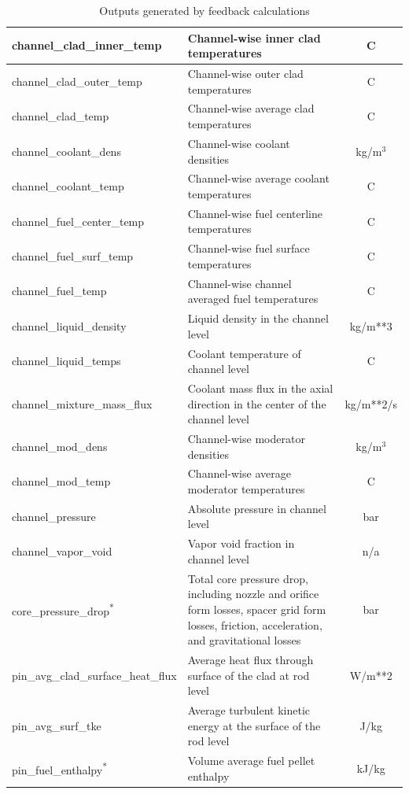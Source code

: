 \begin{table}[h]
\centering
\caption{Outputs generated by feedback calculations}
\label{tab:feedback-edits}
\begin{tabular}{|l|p{}|c|}\hline
channel\_clad\_inner\_temp & Channel-wise inner clad temperatures & C \\\hline
channel\_clad\_outer\_temp & Channel-wise outer clad temperatures & C \\\hline
channel\_clad\_temp & Channel-wise average clad temperatures & C \\\hline
channel\_coolant\_dens & Channel-wise coolant densities & kg/m$^3$ \\\hline
channel\_coolant\_temp & Channel-wise average coolant temperatures & C \\\hline
channel\_fuel\_center\_temp & Channel-wise fuel centerline temperatures & C \\\hline
channel\_fuel\_surf\_temp & Channel-wise fuel surface temperatures & C \\\hline
channel\_fuel\_temp & Channel-wise channel averaged fuel temperatures & C \\\hline
channel\_liquid\_density & Liquid density in the channel level & kg/m**3 \\\hline
channel\_liquid\_temps & Coolant temperature of channel level & C \\\hline
channel\_mixture\_mass\_flux & Coolant mass flux in the axial direction in the center of the channel level & kg/m**2/s \\\hline
channel\_mod\_dens & Channel-wise moderator densities & kg/m$^3$ \\\hline
channel\_mod\_temp & Channel-wise average moderator temperatures & C \\\hline
channel\_pressure & Absolute pressure in channel level & bar \\\hline
channel\_vapor\_void & Vapor void fraction in channel level & n/a \\\hline
core\_pressure\_drop\textsuperscript{*} & Total core pressure drop, including nozzle and orifice form losses, spacer grid form losses, friction, acceleration, and gravitational losses & bar \\\hline
pin\_avg\_clad\_surface\_heat\_flux & Average heat flux through surface of the clad at rod level & W/m**2 \\\hline
pin\_avg\_surf\_tke & Average turbulent kinetic energy at the surface of the rod level & J/kg \\\hline
pin\_fuel\_enthalpy\textsuperscript{*} & Volume average fuel pellet enthalpy & kJ/kg \\\hline

\end{tabular}
\end{table}
